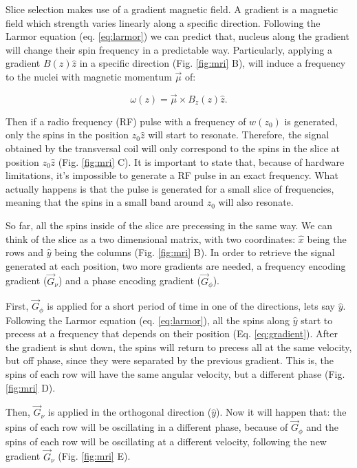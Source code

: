 Slice selection makes use of a gradient magnetic field. A gradient is a magnetic
field which strength varies linearly along a specific direction. Following the
Larmor equation (eq. \ref{eq:larmor}) we can predict that, nucleus along the
gradient will change their spin frequency in a predictable way. Particularly,
applying a gradient $B(z) \hat z$ in a specific direction (Fig. \ref{fig:mri} B),
will induce a frequency to the nuclei with magnetic momentum $\vec \mu$ of:

\begin{equation}
\label{eq:gradient}
    \omega(z) = \vec \mu \times B_z(z) \hat z.
\end{equation}

Then if a radio frequency (RF) pulse with a frequency of $w(z_0)$ is generated,
only the spins in the position $z_0 \hat z$ will start to resonate. Therefore,
the signal obtained by the transversal coil will only correspond to the spins in
the slice at position $z_0 \hat z $ (Fig. \ref{fig:mri} C). It is important to state that, because of
hardware limitations, it's impossible to generate a RF pulse in an exact frequency.
What actually happens is that the pulse is generated for a small slice of
frequencies, meaning that the spins in a small band around $z_0$ will also
resonate.

So far, all the spins inside of the slice are precessing in the same way.
We can think of the slice as a two dimensional matrix, with two coordinates:
$\hat x$ being the rows and $\hat y$ being the columns (Fig. \ref{fig:mri} B).
In order to retrieve the signal generated at each position, two more gradients
are needed, a frequency encoding gradient ($\vec G_{\nu}$) and a phase encoding
gradient ($\vec G_{\phi}$). 

First, $\vec G_{\phi}$ is applied for a short period of time in one of
the directions, lets say $\hat y$. Following the Larmor equation (eq. \ref{eq:larmor}),
all the spins along $\hat y$ start to precess at a frequency that depends
on their position (Eq. \ref{eq:gradient}). After the gradient is shut down, the
spins will return to precess all at the same velocity, but off phase, since they 
were separated by the previous gradient. This is, the spins of each row will
have the same angular velocity, but a different phase (Fig. \ref{fig:mri} D).

Then, $\vec G_{\nu}$ is applied in the orthogonal direction ($\hat y$).
Now it will happen that: the spins of each row will be oscillating in a
different phase, because of $\vec G_{\phi}$ and the spins of each row will be
oscillating at a different velocity, following the new gradient $\vec G_{\nu}$
(Fig. \ref{fig:mri} E).

